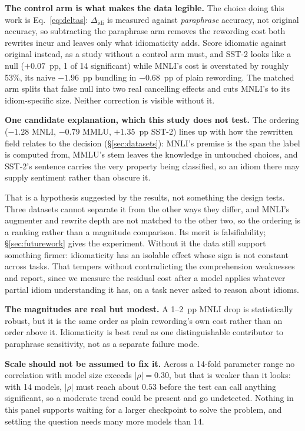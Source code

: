 \documentclass{article}   %
\newcommand{\citetf}[1]{\citet{#1}}
\begin{document}
\textbf{The control arm is what makes the data legible.} The choice doing this
work is Eq.~\ref{eq:deltas}: $\Delta_{\text{idi}}$ is measured against
\emph{paraphrase} accuracy, not original accuracy, so subtracting the
paraphrase arm removes the rewording cost both rewrites incur and leaves only
what idiomaticity adds. Score idiomatic against original instead, as a study
without a control arm must, and SST-2 looks like a null ($+0.07$~pp, 1 of 14
significant) while MNLI's cost is overstated by roughly 53\%, its naive
$-1.96$~pp bundling in $-0.68$~pp of plain rewording. The matched arm splits
that false null into two real cancelling effects and cuts MNLI's to its
idiom-specific size. Neither correction is visible without it.

\textbf{One candidate explanation, which this study does not test.} The
ordering ($-1.28$ MNLI, $-0.79$ MMLU, $+1.35$~pp SST-2) lines up with how the
rewritten field relates to the decision (\S\ref{sec:datasets}): MNLI's premise
is the span the label is computed from, MMLU's stem leaves the knowledge in
untouched choices, and SST-2's sentence carries the very property being
classified, so an idiom there may supply sentiment rather than obscure it.

That is a hypothesis suggested by the results, not something the design tests.
Three datasets cannot separate it from the other ways they differ, and MNLI's
augmenter and rewrite depth are not matched to the other two, so the ordering
is a ranking rather than a magnitude comparison. Its merit is falsifiability;
\S\ref{sec:futurework} gives the experiment. Without it the data still support
something firmer: idiomaticity has an isolable effect whose sign is not
constant across tasks. That tempers without contradicting the comprehension
weaknesses \citetf{tayyar2021astitch} and \citetf{chakrabarty2022flute} report,
since we measure the residual cost after a model applies whatever partial idiom
understanding it has, on a task never asked to reason about idioms.

\textbf{The magnitudes are real but modest.} A 1--2~pp MNLI drop is
statistically robust, but it is the same order as plain rewording's own cost
rather than an order above it. Idiomaticity is best read as one distinguishable
contributor to paraphrase sensitivity, not as a separate failure mode.

\textbf{Scale should not be assumed to fix it.} Across a 14-fold parameter
range no correlation with model size exceeds $|\rho|=0.30$, but that is weaker
than it looks: with 14 models, $|\rho|$ must reach about $0.53$ before the test
can call anything significant, so a moderate trend could be present and go
undetected. Nothing in this panel supports waiting for a larger checkpoint to
solve the problem, and settling the question needs many more models than 14.
\end{document}
